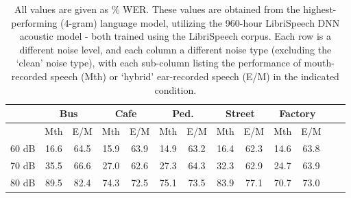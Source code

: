 \begin{table}[h]
\begin{center}
\begin{tabular}{| c || c | c | c | c | c | c | c | c | c | c | c | c |} \hline
      & \multicolumn{2}{|c|}{Bus} & \multicolumn{2}{|c|}{Cafe} & \multicolumn{2}{|c|}{Ped.} & \multicolumn{2}{|c|}{Street} & \multicolumn{2}{|c|}{Factory} \\ \hline
      & Mth & E/M & Mth & E/M & Mth & E/M & Mth & E/M & Mth & E/M \\ \hline\hline
60 dB & 16.6 & 64.5 & 15.9 & 63.9 & 14.9 & 63.2 & 16.4 & 62.3 & 14.6 & 63.8  \\ \hline
70 dB & 35.5 & 66.6 & 27.0 & 62.6 & 27.3 & 64.3 & 32.3 & 62.9 & 24.7 & 63.9  \\ \hline
80 dB & 89.5 & 82.4 & 74.3 & 72.5 & 75.1 & 73.5 & 83.9 & 77.1 & 70.7 & 73.0  \\ \hline
\end{tabular}
\end{center}
\caption{All values are given as \% WER. These values are obtained from the highest-performing (4-gram) language model, utilizing the 960-hour LibriSpeech DNN acoustic model - both trained using the LibriSpeech corpus.  Each row is a different noise level, and each column a different noise type (excluding the `clean' noise type), with each sub-column listing the performance of mouth-recorded speech (Mth) or `hybrid' ear-recorded speech (E/M) in the indicated condition.}\label{tab:hybrid-wers}
\end{table}


